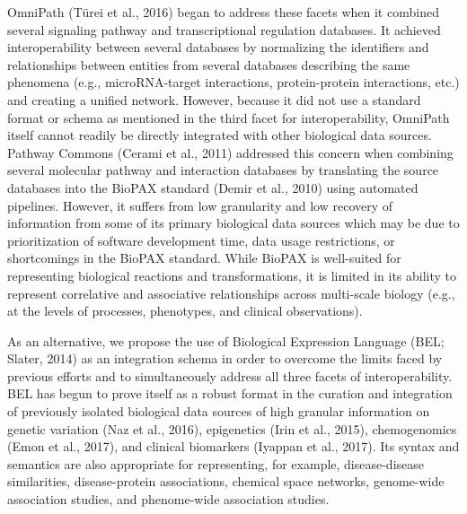 OmniPath (T\"urei et al., 2016) began to address these facets when it combined several signaling pathway and transcriptional regulation databases.
It achieved interoperability between several databases by normalizing the identifiers and relationships between entities from several databases describing the same phenomena (e.g., microRNA-target interactions, protein-protein interactions, etc.) and creating a unified network.
However, because it did not use a standard format or schema as mentioned in the third facet for interoperability, OmniPath itself cannot readily be directly integrated with other biological data sources.
Pathway Commons (Cerami et al., 2011) addressed this concern when combining several molecular pathway and interaction databases by translating the source databases into the BioPAX standard (Demir et al., 2010) using automated pipelines.
However, it suffers from low granularity and low recovery of information from some of its primary biological data sources which may be due to prioritization of software development time, data usage restrictions, or shortcomings in the BioPAX standard.
While BioPAX is well-suited for representing biological reactions and transformations, it is limited in its ability to represent correlative and associative relationships across multi-scale biology (e.g., at the levels of processes, phenotypes, and clinical observations).

As an alternative, we propose the use of Biological Expression Language (BEL; Slater, 2014) as an integration schema in order to overcome the limits faced by previous efforts and to simultaneously address all three facets of interoperability.
BEL has begun to prove itself as a robust format in the curation and integration of previously isolated biological data sources of high granular information on genetic variation (Naz et al., 2016), epigenetics (Irin et al., 2015), chemogenomics (Emon et al., 2017), and clinical biomarkers (Iyappan et al., 2017).
Its syntax and semantics are also appropriate for representing, for example, disease-disease similarities, disease-protein associations, chemical space networks, genome-wide association studies, and phenome-wide association studies.

